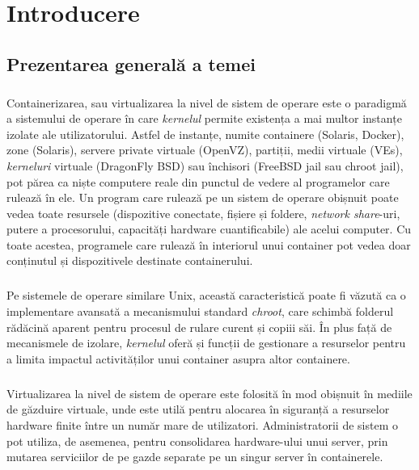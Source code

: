 \chapter{Introducere}

\section{Prezentarea generală a temei}
    \paragraph{} Containerizarea, sau virtualizarea la nivel de sistem de operare este o paradigmă a sistemului de operare în care \textit{kernelul} permite existența a mai multor instanțe izolate ale utilizatorului. Astfel de instanțe, numite containere (Solaris, Docker), zone (Solaris), servere private virtuale (OpenVZ), partiții, medii virtuale (VEs), \textit{kerneluri} virtuale (DragonFly BSD) sau închisori (FreeBSD jail sau chroot jail), pot părea ca niște computere reale din punctul de vedere al programelor care rulează în ele. Un program care rulează pe un sistem de operare obișnuit poate vedea toate resursele (dispozitive conectate, fișiere și foldere, \textit{network share}-uri, putere a procesorului, capacități hardware cuantificabile) ale acelui computer. Cu toate acestea, programele care rulează în interiorul unui container pot vedea doar conținutul și dispozitivele destinate containerului. \cite{wiki:osv}
    \paragraph{} Pe sistemele de operare similare Unix, această caracteristică poate fi văzută ca o implementare avansată a mecanismului standard \textit{chroot}, care schimbă folderul rădăcină aparent pentru procesul de rulare curent și copiii săi. În plus față de mecanismele de izolare, \textit{kernelul} oferă și funcții de gestionare a resurselor pentru a limita impactul activităților unui container asupra altor containere. \cite{wiki:osv}
    \paragraph{} Virtualizarea la nivel de sistem de operare este folosită în mod obișnuit în mediile de găzduire virtuale, unde este utilă pentru alocarea în siguranță a resurselor hardware finite între un număr mare de utilizatori. Administratorii de sistem o pot utiliza, de asemenea, pentru consolidarea hardware-ului unui server, prin mutarea serviciilor de pe gazde separate pe un singur server în containerele. \cite{wiki:osv}
